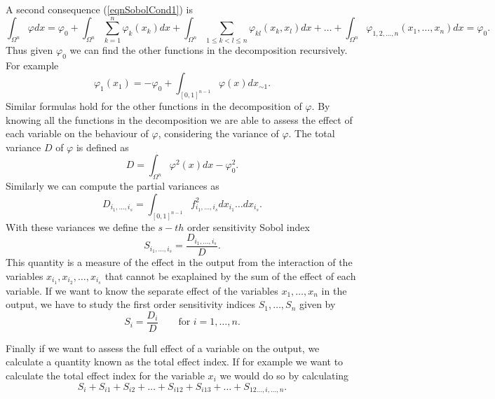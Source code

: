 \documentclass[12pt]{book}
\begin{document}
A second consequence (\ref{eqnSobolCond1}) is 
\begin{equation*}
\int_{\Omega^{n}}\varphi dx=\varphi_{0}+\int_{\Omega^{n}}\sum_{k=1}^{n}\varphi_{k}(x_{k})dx+
\int_{\Omega^{n}}\sum_{1\leq k< l\leq n}\varphi_{kl}(x_{k},x_{l})dx+\ldots+
\int_{\Omega^{n}}\varphi_{1,2,\ldots,n}(x_{1},\ldots,x_{n})dx=\varphi_{0}.
\end{equation*}
Thus given $\varphi_{0}$ we can find the other functions in the decomposition recursively. For example  
\begin{equation*}
\varphi_{1}(x_{1})=-\varphi_{0}+\int_{[0,1]^{n-1}}\varphi(x)dx_{\sim 1}.
\end{equation*}
Similar formulas hold for the other functions in  the decomposition of $\varphi$. By knowing all
the functions in the decomposition we are able  to assess the effect of each variable on the 
behaviour of $\varphi$, considering the variance of $\varphi$. The total variance $D$ of $\varphi$ is defined as
\begin{equation*}
D=\int_{\Omega^{n}}\varphi^{2}(x)dx-\varphi_{0}^{2}.
\end{equation*}
Similarly we can compute the partial variances as
\begin{equation*}
D_{i_{1},\ldots,i_{s}}=\int_{[0,1]^{n-1}}f^{2}_{i_{1},\ldots,i_{s}}dx_{i_{1}}\ldots dx_{i_{s}}.
\end{equation*}
With these variances we define the $s-th$ order sensitivity Sobol index  
\begin{equation*} 
S_{i_{1},\ldots,i_{s}}=\frac{D_{i_{1},\ldots,i_{s}}}{D}.
\end{equation*}
This quantity is a measure of the effect in the output from the interaction of the 
variables $x_{i_{1}},x_{i_{2}},\ldots,x_{i_{s}}$ that cannot be exaplained by 
the sum of the effect of each variable. If 
we want to know the separate effect  of the variables 
$x_{1},\ldots,x_{n}$ in the output, we have to study
the first order sensitivity indices $S_{1},\ldots,S_{n}$ given by
\begin{equation*}
S_{i}=\frac{D_{i}}{D}\qquad\text{for }i=1,\ldots,n.
\end{equation*}

Finally if we want to assess the full effect of a  variable  on the output, we calculate a quantity known 
as the total effect index. If for example we want to calculate the total effect index
for the variable $x_{i}$ we would do so by calculating
\begin{equation*}
S_{i}+S_{i1}+S_{i2}+\ldots+S_{i12}+S_{i13}+\ldots+S_{12\ldots,i,\ldots, n}.
\end{equation*}
\end{document}
